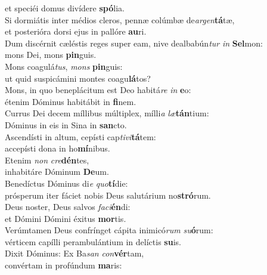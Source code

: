 \oddverse et speciéi domus divídere \textbf{spó}lia.\\
\evenverse Si dormiátis inter médios cleros, pennæ colúmbæ de\textit{ar}\textit{gen}\textbf{tá}tæ,~\*\\
\evenverse et posterióra dorsi ejus in pallóre \textbf{au}ri.\\
\oddverse Dum discérnit cæléstis reges super eam, nive dealbabún\textit{tur} \textit{in} \textbf{Sel}mon:~\*\\
\oddverse mons Dei, mons \textbf{pin}guis.\\
\evenverse Mons coagulá\textit{tus}, \textit{mons} \textbf{pin}guis:~\*\\
\evenverse ut quid suspicámini montes coagu\textbf{lá}tos?\\
\oddverse Mons, in quo beneplácitum est Deo habitá\textit{re} \textit{in} \textbf{e}o:~\*\\
\oddverse étenim Dóminus habitábit in \textbf{fi}nem.\\
\evenverse Currus Dei decem míllibus múltiplex, mílli\textit{a} \textit{læ}\textbf{tán}tium:~\*\\
\evenverse Dóminus in eis in Sina in \textbf{san}cto.\\
\oddverse Ascendísti in altum, cepísti cap\textit{ti}\textit{vi}\textbf{tá}tem:~\*\\
\oddverse accepísti dona in ho\textbf{mí}nibus.\\
\evenverse Etenim \textit{non} \textit{cre}\textbf{dén}tes,~\*\\
\evenverse inhabitáre Dóminum \textbf{De}um.\\
\oddverse Benedíctus Dóminus di\textit{e} \textit{quo}\textbf{tí}die:~\*\\
\oddverse prósperum iter fáciet nobis Deus salutárium no\textbf{stró}rum.\\
\evenverse Deus noster, Deus salvos \textit{fa}\textit{ci}\textbf{én}di:~\*\\
\evenverse et Dómini Dómini éxitus \textbf{mor}tis.\\
\oddverse Verúmtamen Deus confrínget cápita inimicó\textit{rum} \textit{su}\textbf{ó}rum:~\*\\
\oddverse vérticem capílli perambulántium in delíctis \textbf{su}is.\\
\evenverse Dixit Dóminus: Ex Ba\textit{san} \textit{con}\textbf{vér}tam,~\*\\
\evenverse convértam in profúndum \textbf{ma}ris:\\
